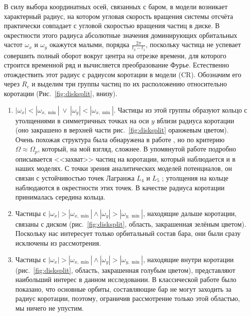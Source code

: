 \documentclass[tikz]{trlnotes}
\begin{document}
В силу выбора координатных осей, связанных с баром, в модели возникает характерный радиус, на котором угловая скорость вращения системы отсчёта практически совпадает с угловой скоростью вращения частиц в диске.
В окрестности этого радиуса абсолютные значения доминирующих
орбитальных частот $\omega_x$ и $\omega_y$ окажутся малыми, порядка $\frac{2\pi}{t_2 - t_1}$, поскольку частица не успевает совершить полный оборот вокруг центра на отрезке времени, для которого строится временной ряд и вычисляется преобразование Фурье. Естественно отождествить этот радиус с радиусом
коротации в модели (CR). Обозначим его через $R_c$ и выделим три группы частиц по их расположению относительно коротации
(Рис.~\ref{fig:disksplit}, внизу).
\begin{enumerate}
  \item $|ω_x| < |ω_{x, \min}| \:\lor\: |ω_y| < |ω_{x, \min}|$.
Частицы из этой группы образуют кольцо с утолщениями в
симметричных точках на оси $y$ вблизи радиуса коротации (оно закрашено в верхней части рис.~\ref{fig:disksplit} оранжевым цветом).
Очень похожая структура была обнаружена в работе \citet{ceverino2007}, но по критерию $Ω \approx Ω_p$, который, на мой взгляд, сложнее. В упомянутой работе подробно описывается <<захват>> частиц на коротации, который
наблюдается и в наших моделях. С точки зрения аналитических моделей потенциалов, он связан с устойчивостью
точек Лагранжа $L_4$ и $L_5$ \citep[Fig.~3.14]{2008gady.book.....B}; утолщения на кольце наблюдаются в окрестности этих точек.
В качестве радиуса коротации принималась середина кольца.  
\item Частицы с $|ω_x| > |ω_{x, \min}| \land |ω_y| > |ω_{y, \min}|$, находящие дальше коротации, связаны с диском
(рис.~\ref{fig:disksplit}, область, закрашенная зелёным цветом). Поскольку нас интересует только орбитальный состав бара, они были сразу исключены из рассмотрения. 
\item Частицы с $|ω_x| > |ω_{x, \min}| \land |ω_y| > |ω_{y, \min}|$,
  находящие внутри коротации (рис.~\ref{fig:disksplit}, область, закрашенная голубым цветом), представляют наибольший интерес в данном
  исследовании. В классической работе \citet{contopoulos1980} было
  показано, что основные орбиты, составляющие
бар не могут заходить за радиус коротации, поэтому, ограничив рассмотрение только этой областью, мы ничего не
упустим.
\end{enumerate}
\end{document}
